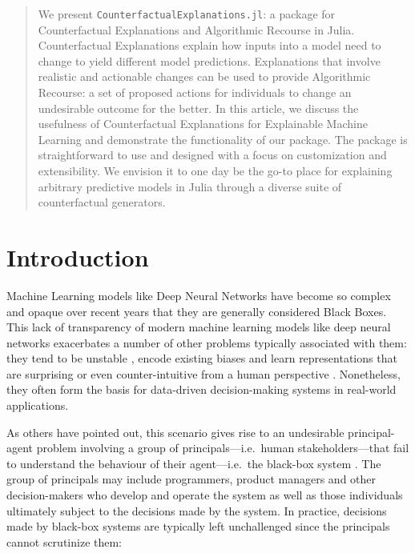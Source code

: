 \documentclass{juliacon}
\begin{document}
\captionsetup[lstlisting]{singlelinecheck=false, margin=0pt}
\renewcommand\lstlistingname{Code}




\maketitle

\begin{abstract}

We present \verb|CounterfactualExplanations.jl|: a package for Counterfactual Explanations and Algorithmic Recourse in Julia. Counterfactual Explanations explain how inputs into a model need to change to yield different model predictions. Explanations that involve realistic and actionable changes can be used to provide Algorithmic Recourse: a set of proposed actions for individuals to change an undesirable outcome for the better. In this article, we discuss the usefulness of Counterfactual Explanations for Explainable Machine Learning and demonstrate the functionality of our package. The package is straightforward to use and designed with a focus on customization and extensibility. We envision it to one day be the go-to place for explaining arbitrary predictive models in Julia through a diverse suite of counterfactual generators.

\end{abstract}

\hypertarget{sec-intro}{%
\section{Introduction}\label{sec-intro}}

Machine Learning models like Deep Neural Networks have become so complex
and opaque over recent years that they are generally considered Black
Boxes. This lack of transparency of modern machine learning models like
deep neural networks exacerbates a number of other problems typically
associated with them: they tend to be unstable
\cite{goodfellow2014explaining}, encode existing biases
\cite{buolamwini2018gender} and learn representations that are
surprising or even counter-intuitive from a human perspective
\cite{sturm2014simple}. Nonetheless, they often form the basis for
data-driven decision-making systems in real-world applications.

As others have pointed out, this scenario gives rise to an undesirable
principal-agent problem involving a group of principals---i.e.~human
stakeholders---that fail to understand the behaviour of their
agent---i.e.~the black-box system \cite{borch2022machine}. The group of
principals may include programmers, product managers and other
decision-makers who develop and operate the system as well as those
individuals ultimately subject to the decisions made by the system. In
practice, decisions made by black-box systems are typically left
unchallenged since the principals cannot scrutinize them:
\end{document}

